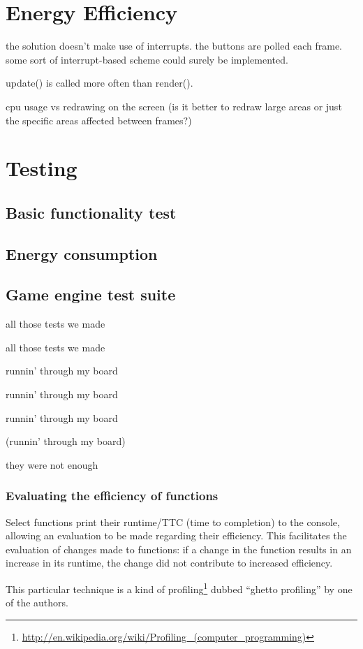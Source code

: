 \section{Energy Efficiency}
	the solution doesn't make use of interrupts.
	the buttons are polled each frame. some sort of interrupt-based scheme could surely be implemented.

	update() is called more often than render().

	cpu usage vs redrawing on the screen (is it better to redraw large areas or just the specific areas affected between frames?)

\section{Testing}
\subsection{Basic functionality test}

\subsection{Energy consumption}


\subsection{Game engine test suite}
	all those tests we made

	all those tests we made

	runnin' through my board

	runnin' through my board

	runnin' through my board

	(runnin' through my board)

	they were not enough
	\subsubsection{Evaluating the efficiency of functions}
		Select functions print their runtime/TTC (time to completion) to the console, allowing an evaluation to be made regarding their efficiency.
		This facilitates the evaluation of changes made to functions: if a change in the function results in an increase in its runtime, the change did not contribute to increased efficiency.

		This particular technique is a kind of profiling\footnote{\url{http://en.wikipedia.org/wiki/Profiling_(computer_programming)}} dubbed ``ghetto profiling'' by one of the authors. 

